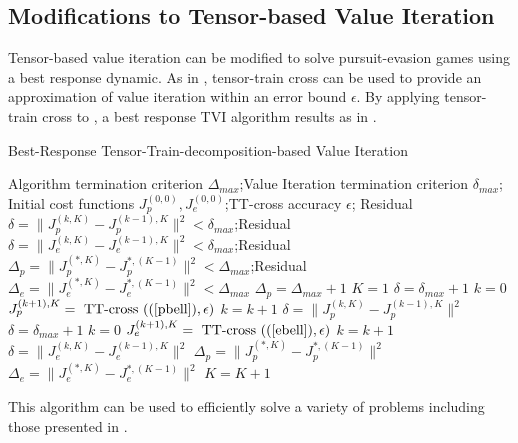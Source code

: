 \subsection{Modifications to Tensor-based Value Iteration}

Tensor-based value iteration can be modified to solve pursuit-evasion games using a best response dynamic. As in \cite{Gorod}, tensor-train cross can be used to provide an approximation of value iteration within an error bound $\epsilon$. By applying tensor-train cross to , a best response TVI algorithm results as in .
\begin{algorithm}
\caption{Best-Response Tensor-Train-decomposition-based Value Iteration }\label{BRTVIalg}
\begin{algorithmic}[1]
	\Require Algorithm termination criterion $\Delta_{max}$;Value Iteration termination criterion $\delta_{max}$; Initial cost functions $J_p^{(0,0)},J_e^{(0,0)}$;TT-cross accuracy $\epsilon$;
	\Ensure Residual $\delta=\|J_p^{(k,K)}-J_p^{(k-1),K}\|^2<\delta_{max}$;Residual $\delta=\|J_e^{(k,K)}-J_e^{(k-1),K}\|^2<\delta_{max}$;Residual $\Delta_p=\|J_p^{(*,K)}-J_p^{*,(K-1)}\|^2<\Delta_{max}$;Residual $\Delta_e=\|J_e^{(*,K)}-J_e^{*,(K-1)}\|^2<\Delta_{max}$
	\State $\Delta_p = \Delta_{max} + 1$
	\State $K = 1$
	 \do{}
		\State $\delta = \delta_{max} + 1$
		\State $k = 0$
		 \do{}
			\State $J_p^{(k+1),K} = \textnormal{ TT-cross }((\ref{pbell}),\epsilon)$
			\State $k = k+1$
			\State $\delta = \|J_p^{(k,K)}-J_p^{(k-1),K}\|^2$
		\EndWhile
		\State $\delta = \delta_{max} + 1$
		\State $k = 0$
		 \do{}
			\State $J_e^{(k+1),K} = \textnormal{ TT-cross }((\ref{ebell}),\epsilon)$
			\State $k = k+1$
			\State $\delta = \|J_e^{(k,K)}-J_e^{(k-1),K}\|^2$
		\EndWhile
		\State $\Delta_p = \|J_p^{(*,K)}-J_p^{*,(K-1)}\|^2$
		\State $\Delta_e = \|J_e^{(*,K)}-J_e^{*,(K-1)}\|^2$
		\State $K = K+1$
	\EndWhile
\end{algorithmic}
\end{algorithm}
This algorithm can be used to efficiently solve a variety of problems including those presented in . 